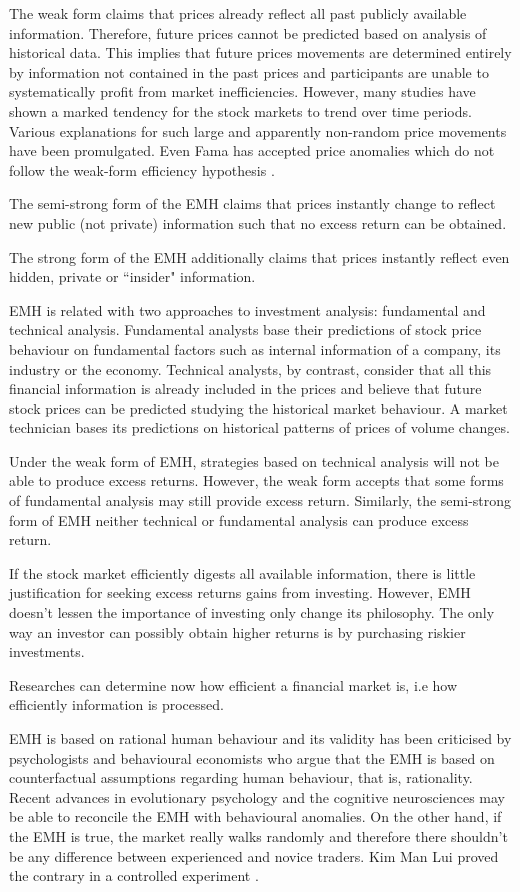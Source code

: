 The weak form claims that prices already reflect all past publicly available information. Therefore, future prices cannot be predicted based on analysis of historical data. This implies that future prices movements are determined entirely by information not contained in the past prices and participants are unable to systematically profit from market inefficiencies.
However, many studies have shown a marked tendency for the stock markets to trend over time periods. Various explanations for such large and apparently non-random price movements have been promulgated. Even Fama has accepted price anomalies which do not follow the weak-form efficiency hypothesis \cite{fama+french2008}.

The semi-strong form of the EMH claims that prices instantly change to reflect new public (not private) information such that no excess return can be obtained. 

The strong form of the EMH additionally claims that prices instantly reflect even hidden, private or ``insider" information. 

EMH is related with two approaches to investment analysis: fundamental and technical analysis. Fundamental analysts base their predictions of stock price behaviour on fundamental factors such as internal information of a company, its industry or the economy. Technical analysts, by contrast, consider that all this financial information is already included in the prices and believe that future stock prices can be predicted studying the historical market behaviour. A market technician bases its predictions on historical patterns of prices of volume changes.

Under the weak form of EMH, strategies based on technical analysis will not be able to produce excess returns. However, the weak form accepts that some forms of fundamental analysis may still provide excess return. Similarly, the semi-strong form of EMH  neither technical or fundamental analysis can produce excess return.

If the stock market efficiently digests all available information, there is little justification for seeking excess returns gains from investing. However, EMH doesn't lessen the importance of investing only change its philosophy. The only way an investor can possibly obtain higher returns is by purchasing riskier investments.

 Researches can determine now how efficient a financial market is, i.e how efficiently information is processed.  

EMH is based on rational human behaviour and its validity has been criticised by
psychologists and behavioural economists who argue that the EMH is based
on counterfactual assumptions regarding human behaviour, that is,
rationality. Recent advances in evolutionary psychology and the cognitive
neurosciences may be able to reconcile the EMH with behavioural
anomalies. On the other hand, if the EMH is true, the market really walks randomly and therefore there shouldn't be any difference between experienced and novice traders. Kim Man Lui proved the contrary in a controlled experiment \cite{man2013}.

